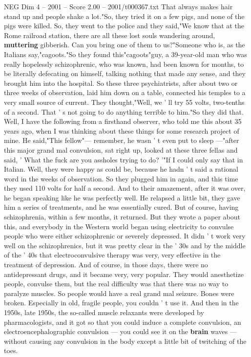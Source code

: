 \begin{textsample}{NEG Dim 4 – 2001 – Score 2.00 – 2001/t000367.txt}
That always makes hair stand up and people shake a lot."So, they tried it on a few pigs, and none of the pigs were killed.
So, they went to the police and they said,"We know that at the Rome railroad station, there are all these lost souls wandering around, \textbf{muttering} gibberish.
Can you bring one of them to us?"Someone who is, as the Italians say,"cagoots."So they found this"cagoots"guy, a 39-year-old man who was really hopelessly schizophrenic, who was known, had been known for months, to be literally defecating on himself, talking nothing that made any sense, and they brought him into the hospital.
So these three psychiatrists, after about two or three weeks of observation, laid him down on a table, connected his temples to a very small source of current.
They thought,"Well, we ' ll try 55 volts, two-tenths of a second.
That ' s not going to do anything terrible to him."So they did that.
Well, I have the following from a firsthand observer, who told me this about 35 years ago, when I was thinking about these things for some research project of mine.
He said,"This fellow"— remember, he wasn ' t even put to sleep —"after this major grand mal convulsion, sat right up, looked at these three fellas and said, ' What the fuck are you assholes trying to do? '"If I could only say that in Italian.
Well, they were happy as could be, because he hadn ' t said a rational word in the weeks of observation.
So they plugged him in again, and this time they used 110 volts for half a second.
And to their amazement, after it was over, he began speaking like he was perfectly well.
He relapsed a little bit, they gave him a series of treatments, and he was essentially cured.
But of course, having schizophrenia, within a few months, it returned.
But they wrote a paper about this, and everybody in the Western world began using electricity to convulse people who were either schizophrenic or severely depressed.
It didn ' t work very well on the schizophrenics, but it was pretty clear in the ' 30s and by the middle of the ' 40s that electroconvulsive therapy was very, very effective in the treatment of depression.
And of course, in those days, there were no antidepressant drugs, and it became very, very popular.
They would anesthetize people, convulse them, but the real difficulty was that there was no way to paralyze muscles.
So people would have a real grand mal seizure.
Bones were broken.
Especially in old, fragile people, you couldn ' t use it.
And then in the 1950s, late 1950s, the so-called muscle relaxants were developed by pharmacologists, and it got so that you could induce a complete convulsion, an electroencephalographic convulsion — you could see it on the \textbf{brain} waves — without causing any convulsion in the body except a little bit of twitching of the toes.

\end{textsample}

